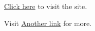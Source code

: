 \href{https://example.com}{Click here} to visit the site.

Visit \href{https://example.org}{Another link} for more.
